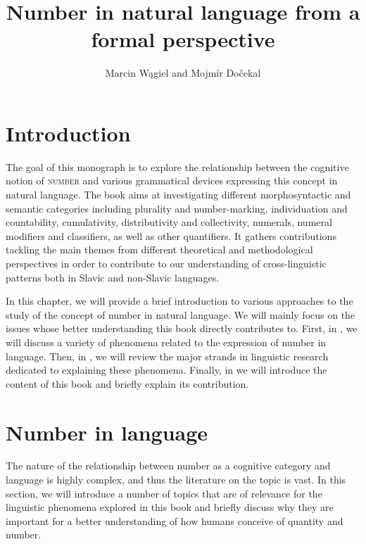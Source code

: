\documentclass[output=paper]{langscibook}
\author{Marcin Wągiel\affiliation{Masaryk University} and  Mojmír Dočekal\affiliation{Masaryk University}}
\title{Number in natural language from a formal perspective}
\begin{document}
\maketitle

\section{Introduction}

The goal of this monograph is to explore the relationship between the cognitive notion of \textsc{number} and various grammatical devices expressing this concept in natural language. The book aims at investigating different morphosyntactic and semantic categories including plurality and number-marking, individuation and countability, cumulativity, distributivity and collectivity, numerals, numeral modifiers and classifiers, as well as other quantifiers. It gathers contributions tackling the main themes from different theoretical and methodological perspectives in order to contribute to our understanding of cross-linguistic patterns both in Slavic and non-Slavic languages.

In this chapter, we will provide a brief introduction to various approaches to the study of the concept of number in natural language. We will mainly focus on the issues whose better understanding this book directly contributes to. First, in , we will discuss a variety of phenomena related to the expression of number in language. Then, in , we will review the major strands in linguistic research dedicated to explaining these phenomena. Finally, in  we will introduce the content of this book and briefly explain its contribution.

\section{Number in language}\label{doc-wag:sec:number-in-language}


The nature of the relationship between number as a cognitive category and language %
is highly complex, and thus the literature on the topic is vast. In this section, we will introduce a number of topics that are of relevance for the linguistic phenomena explored in this book and briefly discuss why they are important for a better understanding of how humans conceive of quantity and number.
\end{document}
